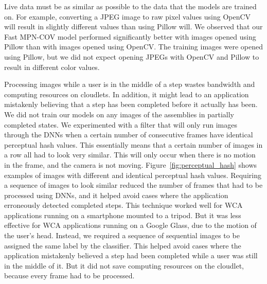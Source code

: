 Live data must be as similar as possible to the data that the models are trained
on. For example, converting a
JPEG image to raw pixel values using OpenCV will result in slightly different
values than using Pillow will. We observed that our Fast MPN-COV model performed
significantly better with images opened using Pillow than with images opened
using OpenCV. The training images were opened using Pillow, but we did not
expect opening JPEGs with OpenCV and Pillow to result in different color values.

Processing images while a user is in the middle of a step wastes bandwidth and
computing resources on cloudlets.
In addition, it might lead to an application mistakenly
believing that a step has been completed before it actually has been.
We did not train our models on any images of the assemblies in partially
completed states.
We experimented with a filter that will only run images through the DNNs when
a certain number of consecutive frames have identical perceptual hash values.
This essentially means that a certain number of images in a row all had to look
very similar.
This will only occur when there is no motion in the frame, and the camera is not
moving.
Figure~\ref{fig:perceptual_hash} shows examples of images with different and
identical perceptual hash values.
Requiring a sequence of images to look similar reduced the number of frames that
had to be processed using DNNs, and it helped avoid cases where the application
erroneously detected completed steps.
This technique worked well for WCA applications running on a smartphone mounted
to a tripod.
But it was less effective for WCA applications running on a Google Glass, due to
the motion of the user's head.
Instead, we required a sequence of sequential images to be assigned the same
label by the classifier.
This helped avoid cases where the application mistakenly believed a step had
been completed while a user was still in the middle of it.
But it did not save computing resources on the cloudlet, because every frame had
to be processed.

